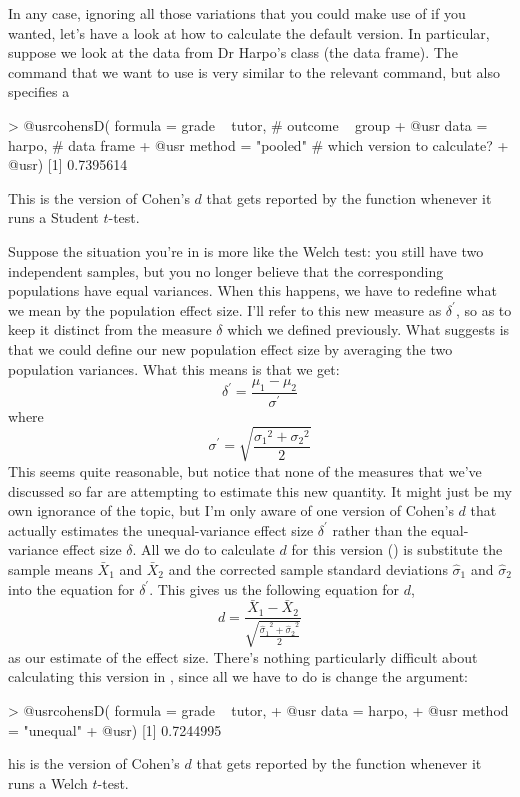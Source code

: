 In any case, ignoring all those variations that you could make use of if you wanted, let's have a look at how to calculate the default version. In particular, suppose we look at the data from Dr Harpo's class (the  data frame). The command that we want to use is very similar to the relevant  command, but also specifies a 
\begin{rblock1}
> @usr{cohensD( formula = grade ~ tutor,}  # outcome ~ group
+ @usr{         data = harpo,}             # data frame 
+ @usr{         method = "pooled"}         # which version to calculate?
+ @usr{)}
[1] 0.7395614
\end{rblock1}
This is the version of Cohen's $d$ that gets reported by the  function whenever it runs a Student $t$-test.


Suppose the situation you're in is more like the Welch test: you still have two independent samples, but you no longer believe that the corresponding populations have equal variances. When this happens, we have to redefine what we mean by the population effect size. I'll refer to this new measure as $\delta^\prime$, so as to keep it distinct from the measure $\delta$ which we defined previously. What  suggests is that we could define our new population effect size by averaging the two population variances. What this means is that we get:
$$
\delta^\prime = \frac{\mu_1 - \mu_2}{\sigma^\prime}
$$
where 
$$
\sigma^\prime = \sqrt{\displaystyle{\frac{ {\sigma_1}^2 + {\sigma_2}^2}{2}}}
$$
This seems quite reasonable, but notice that none of the measures that we've discussed so far are attempting to estimate this new quantity. It might just be my own ignorance of the topic, but I'm only aware of one version of Cohen's $d$ that actually estimates the unequal-variance effect size $\delta^\prime$ rather than the equal-variance effect size $\delta$.
All we do to calculate $d$ for this version () is substitute the sample means $\bar{X}_1$ and $\bar{X}_2$ and the corrected sample standard deviations $\hat{\sigma}_1$ and $\hat{\sigma}_2$ into the equation for $\delta^\prime$. This gives us the following equation for $d$, 
$$
d = \frac{\bar{X}_1 - \bar{X}_2}{\sqrt{\displaystyle{\frac{ {\hat\sigma_1}^2 + {\hat\sigma_2}^2}{2}}}}
$$
as our estimate of the effect size. There's nothing particularly difficult about calculating this version in \R, since all we have to do is change the  argument:
\begin{rblock1}
> @usr{cohensD( formula = grade ~ tutor,} 
+ @usr{         data = harpo,}
+ @usr{         method = "unequal"} 
+ @usr{)}
[1] 0.7244995
\end{rblock1}
his is the version of Cohen's $d$ that gets reported by the  function whenever it runs a Welch $t$-test.




